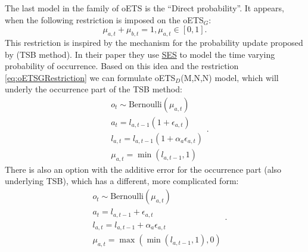 \documentclass[
]{book}
\theoremstyle{definition}
\theoremstyle{definition}
\theoremstyle{definition}
\theoremstyle{definition}
\theoremstyle{remark}
\begin{document}
The last model in the family of oETS is the ``Direct probability''. It appears, when the following restriction is imposed on the oETS\(_G\):
\begin{equation}
    \mu_{a,t} + \mu_{b,t} = 1, \mu_{a,t} \in [0, 1] .
  \label{eq:oETSGRestriction}
\end{equation}
This restriction is inspired by the mechanism for the probability update proposed by \citet{Teunter2011} (TSB method). In their paper they use \protect\hyperlink{SES}{SES} to model the time varying probability of occurrence. Based on this idea and the restriction \eqref{eq:oETSGRestriction} we can formulate oETS\(_D\)(M,N,N) model, which will underly the occurrence part of the TSB method:
\begin{equation}
    \begin{aligned}
        & o_t \sim \text{Bernoulli} \left(\mu_{a,t} \right) \\
        & a_t = l_{a,t-1} \left(1 + \epsilon_{a,t} \right) \\
        & l_{a,t} = l_{a,t-1}( 1  + \alpha_{a} \epsilon_{a,t}) \\
        & \mu_{a,t} = \min(l_{a,t-1}, 1)
    \end{aligned}.
  \label{eq:oETSD}
\end{equation}
There is also an option with the additive error for the occurrence part (also underlying TSB), which has a different, more complicated form:
\begin{equation}
    \begin{aligned}
        & o_t \sim \text{Bernoulli} \left(\mu_{a,t} \right) \\
        & a_t = l_{a,t-1} + \epsilon_{a,t} \\
        & l_{a,t} = l_{a,t-1}  + \alpha_{a} \epsilon_{a,t} \\
        & \mu_{a,t} = \max \left( \min(l_{a,t-1}, 1), 0 \right)
    \end{aligned}.
  \label{eq:oETSDAdditive}
\end{equation}
\end{document}
